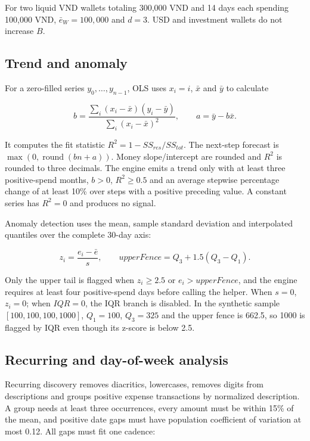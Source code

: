 For two liquid VND wallets totaling 300,000 VND and 14 days each spending 100,000 VND, $\bar e_W=100,000$ and $d=3$. USD and investment wallets do not increase $B$.

\subsection{Trend and anomaly}

For a zero-filled series $y_0,\ldots,y_{n-1}$, OLS uses $x_i=i$, $\bar x$ and $\bar y$ to calculate

\begin{equation}
  b=\frac{\sum_i(x_i-\bar x)(y_i-\bar y)}{\sum_i(x_i-\bar x)^2},
  \qquad a=\bar y-b\bar x.
\end{equation}

It computes the fit statistic $R^2=1-SS_{res}/SS_{tot}$. The next-step forecast is $\max(0,\operatorname{round}(bn+a))$. Money slope/intercept are rounded and $R^2$ is rounded to three decimals. The engine emits a trend only with at least three positive-spend months, $b>0$, $R^2\geq0.5$ and an average stepwise percentage change of at least 10\% over steps with a positive preceding value. A constant series has $R^2=0$ and produces no signal.

Anomaly detection uses the mean, sample standard deviation and interpolated quantiles over the complete 30-day axis:

\begin{equation}
  z_i=\frac{e_i-\bar e}{s},
  \qquad upperFence=Q_3+1.5(Q_3-Q_1).
\end{equation}

Only the upper tail is flagged when $z_i\geq2.5$ or $e_i>upperFence$, and the engine requires at least four positive-spend days before calling the helper. When $s=0$, $z_i=0$; when $IQR=0$, the IQR branch is disabled. In the synthetic sample $[100,100,100,1000]$, $Q_1=100$, $Q_3=325$ and the upper fence is 662.5, so 1000 is flagged by IQR even though its z-score is below 2.5.

\subsection{Recurring and day-of-week analysis}

Recurring discovery removes diacritics, lowercases, removes digits from descriptions and groups positive expense transactions by normalized description. A group needs at least three occurrences, every amount must be within 15\% of the mean, and positive date gaps must have population coefficient of variation at most 0.12. All gaps must fit one cadence:

